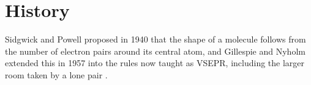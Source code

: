 \section{History}
Sidgwick and Powell proposed in 1940 that the shape of a molecule follows from the number of electron pairs around its central atom, and Gillespie and Nyholm extended this in 1957 into the rules now taught as VSEPR, including the larger room taken by a lone pair \cite{sidgwick1940,gillespie1957}.
